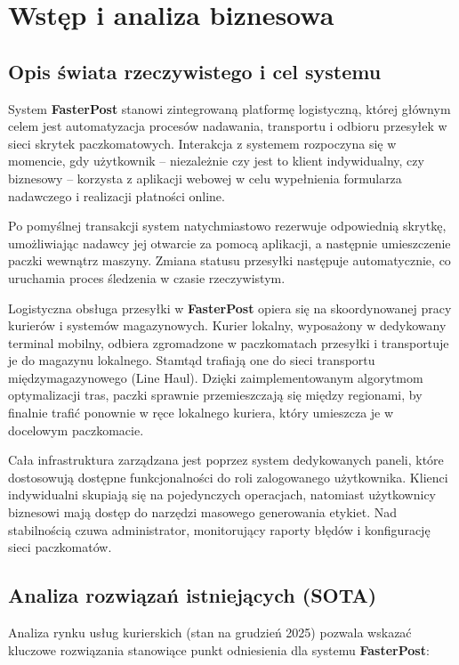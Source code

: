 \chapter{Wstęp i analiza biznesowa}

\section{Opis świata rzeczywistego i cel systemu}

System \textbf{FasterPost} stanowi zintegrowaną platformę logistyczną, której głównym celem jest automatyzacja procesów nadawania, transportu i odbioru przesyłek w sieci skrytek paczkomatowych. Interakcja z systemem rozpoczyna się w momencie, gdy użytkownik – niezależnie czy jest to klient indywidualny, czy biznesowy – korzysta z aplikacji webowej w celu wypełnienia formularza nadawczego i realizacji płatności online.

Po pomyślnej transakcji system natychmiastowo rezerwuje odpowiednią skrytkę, umożliwiając nadawcy jej otwarcie za pomocą aplikacji, a następnie umieszczenie paczki wewnątrz maszyny. Zmiana statusu przesyłki następuje automatycznie, co uruchamia proces śledzenia w czasie rzeczywistym.

Logistyczna obsługa przesyłki w \textbf{FasterPost} opiera się na skoordynowanej pracy kurierów i systemów magazynowych. Kurier lokalny, wyposażony w dedykowany terminal mobilny, odbiera zgromadzone w paczkomatach przesyłki i transportuje je do magazynu lokalnego. Stamtąd trafiają one do sieci transportu międzymagazynowego (Line Haul). Dzięki zaimplementowanym algorytmom optymalizacji tras, paczki sprawnie przemieszczają się między regionami, by finalnie trafić ponownie w ręce lokalnego kuriera, który umieszcza je w docelowym paczkomacie.

Cała infrastruktura zarządzana jest poprzez system dedykowanych paneli, które dostosowują dostępne funkcjonalności do roli zalogowanego użytkownika. Klienci indywidualni skupiają się na pojedynczych operacjach, natomiast użytkownicy biznesowi mają dostęp do narzędzi masowego generowania etykiet. Nad stabilnością czuwa administrator, monitorujący raporty błędów i konfigurację sieci paczkomatów.

\section{Analiza rozwiązań istniejących (SOTA)}

Analiza rynku usług kurierskich (stan na grudzień 2025) pozwala wskazać kluczowe rozwiązania stanowiące punkt odniesienia dla systemu \textbf{FasterPost}:

